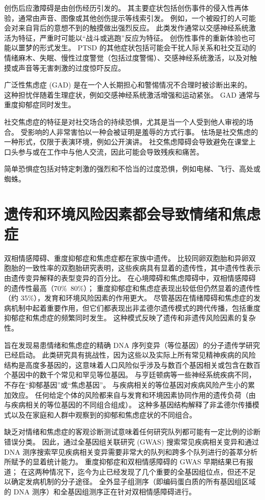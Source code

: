 创伤后应激障碍是由创伤经历引发的。
其主要症状包括创伤事件的侵入性再体验，通常由声音、图像或其他创伤提示等线索引发。
例如，一个被殴打的人可能会对来自背后的意想不到的触摸做出强烈反应。
此类发作通常以交感神经系统激活为特征，严重时可能以“战斗或逃跑”反应为特征。
创伤性事件的重新体验也可能以噩梦的形式发生。
PTSD 的其他症状包括可能会干扰人际关系和社交互动的情绪麻木、失眠、慢性过度警觉（包括过度警惕）、交感神经系统激活，以及对触摸或声音等无害刺激的过度惊吓反应。


广泛性焦虑症 (GAD) 是在一个人长期担心和警惕情况不合理时被诊断出来的。
这种担忧伴随着生理症状，例如交感神经系统激活增强和运动紧张。
GAD 通常与重度抑郁症同时发生。


社交焦虑症的特征是对社交场合的持续恐惧，尤其是当一个人受到他人审视的场合。
受影响的人非常害怕以一种会被证明是羞辱的方式行事。
怯场是社交焦虑的一种形式，仅限于表演环境，例如公开演讲。
社交焦虑障碍会导致避免在课堂上口头参与或在工作中与他人交流，因此可能会导致残疾和痛苦。


简单恐惧症包括对特定刺激的强烈和不恰当的过度恐惧，例如电梯、飞行、高处或蜘蛛。


\section{遗传和环境风险因素都会导致情绪和焦虑症}

双相情感障碍、重度抑郁症和焦虑症都在家族中遗传。
比较同卵双胞胎和异卵双胞胎的一致性率的双胞胎研究表明，这些疾病具有显着的遗传性，其中遗传性表示由遗传变异解释的表型变异的百分比。
在心境障碍和焦虑障碍中，双相情感障碍的遗传性最高（70\%~80\%）； 重度抑郁症和焦虑症表现出较低但仍然显着的遗传性（约 35\%），发育和环境风险因素的作用更大。
尽管基因在情绪障碍和焦虑症的发病机制中起着重要作用，但它们都表现出非孟德尔遗传模式的跨代传播，包括重度抑郁症和焦虑症的频繁同时发生。
这种模式反映了遗传和非遗传风险因素的复杂性。


旨在发现易患情绪和焦虑症的精确 DNA 序列变异（等位基因）的分子遗传学研究已经启动。
此类研究具有挑战性，因为这些以及实际上所有常见精神疾病的风险结构是高度多基因的，这意味着人口风险似乎涉及与数百个基因相关或包含在数百个基因中的数千个常见和罕见等位基因。
与亨廷顿病等一些神经系统疾病不同，不存在“抑郁基因”或“焦虑基因”。
与疾病相关的等位基因对疾病风险产生小的累加效应。
任何给定个体的风险都来自与发育和环境因素协同作用的遗传负荷（由与疾病相关的等位基因的不同组合组成）。
这种多基因结构解释了非孟德尔传播模式以及在家庭和人群中观察到的抑郁和焦虑症状的不同组合。


缺乏对情绪和焦虑症的客观诊断测试意味着任何研究队列都可能有一定比例的诊断错误分类。
因此，通过全基因组关联研究 (GWAS) 搜索常见疾病相关变异和通过 DNA 测序搜索罕见疾病相关变异需要非常大的队列和跨多个队列进行的荟萃分析所赋予的显着统计能力。
重度抑郁症和双相情感障碍的 GWAS 早期结果已有报道；
在这两种情况下，迄今为止已经发现了几个重要的全基因组位点，但还不足以确定发病机制的分子途径。
全外显子组测序（即编码蛋白质的所有基因组区域的 DNA 测序）和全基因组测序正在针对双相情感障碍进行。


